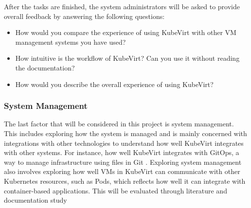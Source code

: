 \documentclass{article}
\begin{document}
\noindent After the tasks are finished, the system administrators will be asked to provide overall feedback by answering the following questions:
\begin{itemize}
    \item How would you compare the experience of using KubeVirt with other VM management systems you have used?
    \item How intuitive is the workflow of KubeVirt? Can you use it without reading the documentation?
    \item How would you describe the overall experience of using KubeVirt?
\end{itemize}

\subsubsection*{System Management}
\noindent The last factor that will be considered in this project is system management. This includes exploring how the system is managed and is mainly concerned with integrations with other technologies to understand how well KubeVirt integrates with other systems. For instance, how well KubeVirt integrates with GitOps, a way to manage infrastructure using files in Git \cite{declarative-benefits}\cite{k8s-gitops}. Exploring system management also involves exploring how well VMs in KubeVirt can communicate with other Kubernetes resources, such as Pods, which reflects how well it can integrate with container-based applications. This will be evaluated through literature and documentation study \cite{k8s-gitops}


\newpage
\printbibliography[heading=bibintoc]
\end{document}
